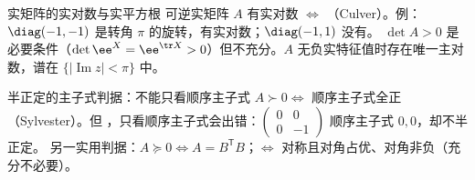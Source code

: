 \begin{结论}{实矩阵的实对数与实平方根}
可逆实矩阵 $A$ 有实对数 $\iff$ （Culver）。例：$\diag(-1,-1)$ 是转角 $\pi$ 的旋转，有实对数；$\diag(-1,1)$ 没有。
$\det A>0$ 是必要条件（$\det\ee^X=\ee^{\tr X}>0$）但不充分。$A$ 无负实特征值时存在唯一主对数，谱在 $\{|\operatorname{Im}z|<\pi\}$ 中。
\end{结论}

\begin{结论}{半正定的主子式判据：不能只看顺序主子式}
$A\succ0\iff$ 顺序主子式全正（Sylvester）。但 ，只看顺序主子式会出错：$\begin{pmatrix}0&0\\0&-1\end{pmatrix}$ 顺序主子式 $0,0$，却不半正定。
另一实用判据：$A\succeq0\iff A=B^{\mathsf T}B$；$\iff$ 对称且对角占优、对角非负（充分不必要）。
\end{结论}

